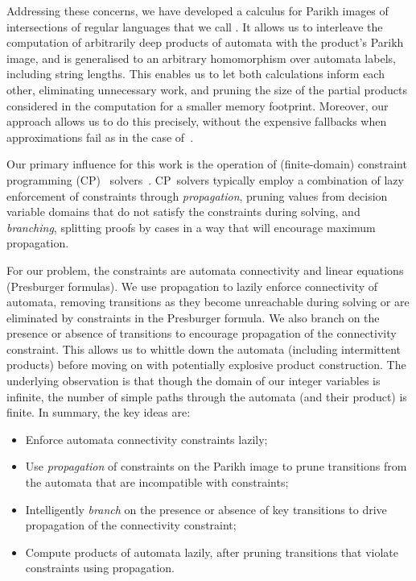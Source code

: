 Addressing these concerns, we have developed a calculus for Parikh images of
intersections of regular languages that we call \Calculus{}. It allows us to
interleave the computation of arbitrarily deep products of automata with the
product's Parikh image, and is generalised to an arbitrary homomorphism over
automata labels, including string lengths. This enables us to let both
calculations inform each other, eliminating unnecessary work, and pruning the
size of the partial products considered in the computation for a smaller memory
footprint. Moreover, our approach allows us to do this precisely, without the expensive
fallbacks when approximations fail as in the case of~\cite{approximate-parikh}.

Our primary influence for this work is the operation of (finite-domain) 
constraint programming (CP)%
~solvers~\cite{cp}. CP~solvers typically employ a combination of lazy enforcement
of constraints through \emph{propagation},
pruning values from decision variable domains that do not satisfy 
the constraints during solving, and \emph{branching}, splitting proofs
by cases in a way that will encourage maximum propagation.

For our problem, the constraints are automata connectivity and linear
equations (Presburger formulas).
We use propagation to lazily enforce connectivity of automata,
removing transitions as they become unreachable during solving or are
eliminated by constraints in the Presburger formula. We
also branch on the presence or absence of transitions to
encourage propagation of the connectivity constraint. This allows
us to whittle down the automata
(including intermittent products) before moving on with potentially
 explosive product construction. The underlying observation
is that though the domain of our integer variables
is infinite, the number of simple paths
through the automata (and their product) is finite. In summary, the key ideas are:

{
    \centering
    \begin{tcolorbox}[colback=ourcolour!5!white,colframe=ourcolour!75!black,%
        title=Key paradigms in \Calculus{},%
        width=0.9\linewidth]

        \begin{itemize}
            \item Enforce automata connectivity constraints lazily;
            \item Use \emph{propagation} of constraints on the Parikh image to prune
            transitions from the automata that are incompatible with constraints;
            \item Intelligently \emph{branch} on the presence or absence of key
             transitions to drive propagation of the connectivity constraint;
             \item Compute products of automata lazily, after pruning transitions
             that violate constraints using propagation.
        \end{itemize}
    \end{tcolorbox}
  }

